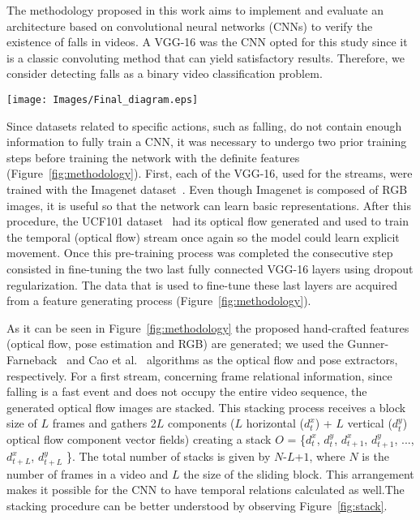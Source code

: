 \documentclass{article}
\begin{document}
The methodology proposed in this work aims to implement and evaluate an architecture based on convolutional neural networks (CNNs) to verify the existence of falls in videos. A VGG-16 was the CNN opted for this study since it is a classic convoluting method that can yield satisfactory results. Therefore, we consider detecting falls as a binary video classification problem.

\begin{figure*}[!htb]
\centering
\texttt{[image: Images/Final\_diagram.eps]}
\caption{Diagram of the proposed multi-stream strategy for fall detection.}
\label{fig:methodology}
\end{figure*}

Since datasets related to specific actions, such as falling, do not contain enough information to fully train a CNN, it was necessary to undergo two prior training steps before training the network with the definite features (Figure~\ref{fig:methodology}). First, each of the VGG-16, used for the streams, were trained with the Imagenet dataset~\cite{deng2009imagenet}. Even though Imagenet is composed of RGB images, it is useful so that the network can learn basic representations. After this procedure, the UCF101 dataset~\cite{soomro2012ucf101} had its optical flow generated and used to train the temporal (optical flow) stream once again so the model could learn explicit movement. Once this pre-training process was completed the consecutive step consisted in fine-tuning the two last fully connected VGG-16 layers using dropout regularization. The data that is used to fine-tune these last layers are acquired from a feature generating process (Figure~\ref{fig:methodology}). 


As it can be seen in Figure~\ref{fig:methodology} the proposed hand-crafted features (optical flow, pose estimation and RGB) are generated; we used the Gunner-Farneback~\cite{lowhur2015dense} and Cao et al.~\cite{cao2016realtime} algorithms as the optical flow and pose extractors, respectively. For a first stream, concerning frame relational information, since falling is a fast event and does not occupy the entire video sequence, the generated optical flow images are stacked. This stacking process receives a block size of $L$ frames and gathers 2$L$ components ($L$ horizontal ($d_t^x$) + $L$ vertical ($d_t^y$) optical flow component vector fields) creating a stack $O$ = \{$d_t^x$, $d_t^y$, $d_{t+1}^x$, $d_{t+1}^y$, ..., $d_{t+L}^x$, $d_{t+L}^y$ \}. The total number of stacks is given by $N$-$L$+$1$, where $N$ is the number of frames in a video and $L$ the size of the sliding block. This arrangement makes it possible for the CNN to have temporal relations calculated as well.The stacking procedure can be better understood by observing Figure~\ref{fig:stack}.
\end{document}
